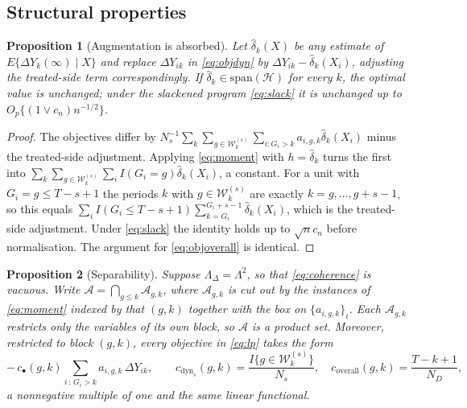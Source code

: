 \documentclass[12pt]{article}
\newtheorem{proposition}{Proposition}
\theoremstyle{remark}
\begin{document}
\subsection{Structural properties}
\label{app:struct}

\begin{proposition}[Augmentation is absorbed]
\label{prop:aug}
Let $\widehat\delta_k(X)$ be any estimate of $E\{\Delta Y_k(\infty) \mid X\}$ and replace
$\Delta Y_{ik}$ in \eqref{eq:objdyn} by $\Delta Y_{ik} - \widehat\delta_k(X_i)$, adjusting
the treated-side term correspondingly. If $\widehat\delta_k \in \mathrm{span}(\mathcal{H})$
for every $k$, the optimal value is unchanged; under the slackened program
\eqref{eq:slack} it is unchanged up to $O_p\{(1 \vee c_n) n^{-1/2}\}$.
\end{proposition}

\begin{proof}
The objectives differ by
$N_s^{-1}\sum_k \sum_{g \in \mathcal{W}^{(s)}_k}\sum_{i:G_i>k} a_{i,g,k}\widehat\delta_k(X_i)$
minus the treated-side adjustment. Applying \eqref{eq:moment} with $h = \widehat\delta_k$
turns the first into $\sum_k \sum_{g \in \mathcal{W}^{(s)}_k}\sum_i I(G_i{=}g)\widehat\delta_k(X_i)$,
a constant. For a unit with $G_i = g \le T-s+1$ the periods $k$ with
$g \in \mathcal{W}^{(s)}_k$ are exactly $k = g, \ldots, g+s-1$, so this equals
$\sum_i I(G_i \le T{-}s{+}1)\sum_{k=G_i}^{G_i+s-1}\widehat\delta_k(X_i)$, which is the
treated-side adjustment. Under \eqref{eq:slack} the identity holds up to $\sqrt{n}c_n$
before normalisation. The argument for \eqref{eq:objoverall} is identical.
\end{proof}

\begin{proposition}[Separability]
\label{prop:sep}
Suppose $\Lambda_\Delta = \Lambda^2$, so that \eqref{eq:coherence} is vacuous. Write
$\mathcal{A} = \bigcap_{g \le k} \mathcal{A}_{g,k}$, where $\mathcal{A}_{g,k}$ is cut out
by the instances of \eqref{eq:moment} indexed by that $(g,k)$ together with the box on
$\{a_{i,g,k}\}_i$. Each $\mathcal{A}_{g,k}$ restricts only the variables of its own block,
so $\mathcal{A}$ is a product set. Moreover, restricted to block $(g,k)$, every objective
in \eqref{eq:lp} takes the form
\[
-\,c_\bullet(g,k) \sum_{i\,:\,G_i > k} a_{i,g,k}\,\Delta Y_{ik},
\qquad
c_{\mathrm{dyn}_s}(g,k) = \frac{I\{g \in \mathcal{W}^{(s)}_k\}}{N_s},
\quad
c_{\mathrm{overall}}(g,k) = \frac{T-k+1}{N_D},
\]
a \emph{nonnegative} multiple of one and the same linear functional.
\end{proposition}
\end{document}
